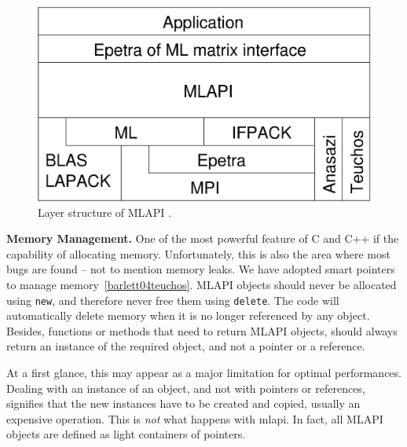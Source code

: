 \documentclass{article}[11pt]
\newcommand{\teuchos}  {{\sc Teuchos}}
\newcommand{\MLAPI}  {{\sc MLAPI }}
\newcommand{\MLAPIns}  {{\sc mlapi}}
\begin{document}
\begin{figure}
\begin{center}
\includegraphics[width=12cm]{layer.eps}
\caption{Layer structure of \MLAPI.}
\label{fig:layer}
\end{center}
\end{figure}

\bigskip

\noindent
{\bf Memory Management.} One of the most powerful feature of C and C++
if the capability of allocating memory. Unfortunately, this is also the
area where most bugs are found -- not to mention memory leaks. We have adopted
smart pointers to manage memory~\ref{barlett04teuchos}.
\MLAPI objects should never be allocated using {\tt new}, and therefore never
free them using {\tt delete}. The code will automatically delete memory
when it is no longer referenced by any object. Besides, functions or methods
that need to return \MLAPI objects, should always return an instance of the
required object, and not a pointer or a reference.

\noindent
At a first glance, this may appear as a major limitation for optimal
performances. Dealing with an instance of an object, and not with pointers or
references, signifies that the new instances have to be created and copied,
usually an expensive operation. This is {\sl not} what happens with \MLAPIns. In
fact, all \MLAPI objects are defined as light containers of pointers. 
\end{document}
